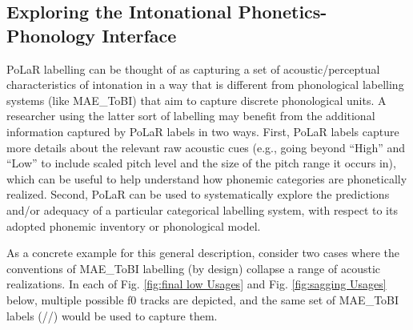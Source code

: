 \documentclass[11pt, twoside]{memoir}
\def\textlabel#1{{\relsize{-.5}\fontspec[Mapping=tex-text]{Roboto Mono}{#1}}}
\begin{document}
\subsection{Exploring the Intonational Phonetics-Phonology Interface}\label{sec:exploring-phonetics-phonology-interface}
PoLaR labelling can be thought of as capturing a set of acoustic\slash perceptual characteristics of intonation in a way that is different from phonological labelling systems (like MAE\_ToBI) that aim to capture discrete phonological units. A researcher using the latter sort of labelling may benefit from the additional information captured by PoLaR labels in two ways. First, PoLaR labels capture more details about the relevant raw acoustic cues (e.g., going beyond “High” and “Low” to include scaled pitch level and the size of the pitch range it occurs in), which can be useful to help understand how phonemic categories are phonetically realized. Second, PoLaR can be used to systematically explore the predictions and/or adequacy of a particular categorical labelling system, with respect to its adopted phonemic inventory or phonological model.

As a concrete example for this general description, consider two cases where the conventions of MAE\_ToBI labelling (by design) collapse a range of acoustic realizations. In each of Fig. \ref{fig:final low Usages} and Fig. \ref{fig:sagging Usages} below, multiple possible f0 tracks are depicted, and the same set of MAE\_ToBI labels (/\textlabel{H* H* L-L\%}/) would be used to capture them.
\end{document}
